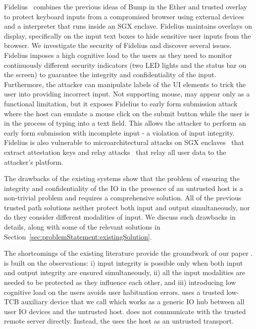Fidelius~\cite{Fidelius} combines the previous ideas of Bump in the Ether and trusted overlay to protect keyboard inputs from a compromised browser using external devices and a \js interpreter that runs inside an SGX enclave. Fidelius maintains overlays on display, specifically on the input text boxes to hide sensitive user inputs from the browser. We investigate the security of Fidelius and discover several issues. Fidelius imposes a high cognitive load to the users as they need to monitor continuously different security indicators (two LED lights and the status bar on the screen) to guarantee the integrity and confidentiality of the input. Furthermore, the attacker can manipulate labels of the UI elements to trick the user into providing incorrect input. Not supporting mouse, may appear only as a functional limitation, but it exposes Fidelius to early form submission attack where the host can emulate a mouse click on the submit button while the user is in the process of typing into a text field. This allows the attacker to perform an early form submission with incomplete input - a violation of input integrity. Fidelius is also vulnerable to microarchitectural attacks on SGX enclaves~\cite{van2018foreshadow} that extract attestation keys and relay attacks~\cite{dhar2018proximitee} that relay all user data to the attacker's platform.

The drawbacks of the existing systems show that the problem of ensuring the integrity and confidentiality of the IO in the presence of an untrusted host is a non-trivial problem and requires a comprehensive solution. All of the previous trusted path solutions neither protect both input and output simultaneously, nor do they consider different modalities of input. We discuss such drawbacks in details, along with some of the relevant solutions in Section~\ref{sec:problemStatement:existingSolution}.

 
 The shortcomings of the existing literature provide the groundwork of our paper \name.
\name is built on the observations: i) input integrity is possible only when both input and output integrity are ensured simultaneously, ii) all the input modalities are needed to be protected as they influence each other, and iii) introducing low cognitive load on the users avoids user habituation errors. \name uses a trusted low-TCB auxiliary device that we call \device which works as a generic IO hub between all user IO devices and the untrusted host. \device does not communicate with the trusted remote server directly. Instead, the \device uses the host as an untrusted transport.

